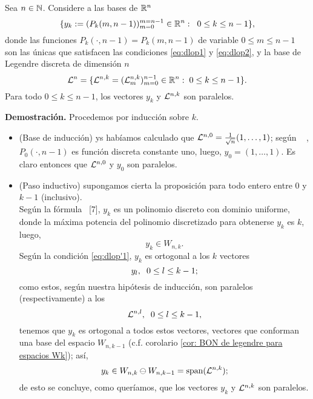 \begin{lema}
\label{prop: legendre y DLOPS son paralelos}
Sea $n \in \mathbb{N}$. 
Considere a 
las bases de $\mathbb{R}^{n}$
\begin{equation}
\label{eq0: base DLOP}
\{
y_{k}:= (P_{k}(m, n-1))_{m=0}^{m=n-1} \in \mathbb{R}^{n}
: \hspace{0.2cm} 0 \leq k \leq n-1
\},
\end{equation}
donde las funciones $P_{k}(\cdot , n-1)= P_{k}(m , n-1)$ de variable 
$0 \leq m \leq n-1$
son las únicas que satisfacen las condiciones
\eqref{eq:dlop1} y \eqref{eq:dlop2},
y la base de Legendre discreta de dimensión $n$
\begin{equation}
\label{eq0: base de Legendre discreta}
\mathcal{L}^{n}=\{ \mathcal{L}^{n,k}= (\mathcal{L}_{m}^{n,k})_{m=0}^{n-1} \in \mathbb{R}^{n} : 
\hspace{0.1cm} 0 \leq k \leq n-1\}.
\end{equation}
Para todo $0 \leq k \leq n-1$, los vectores 
$y_{k}$ y $\mathcal{L}^{n,k}$ son paralelos.
\end{lema}
\noindent
\textbf{Demostración.}
Procedemos por inducción sobre $k$.
\begin{itemize}
	\item  (Base de inducción) ys habíamos calculado que
	$\mathcal{L}^{n,0}=\frac{1}{\sqrt{n}}(1, \ldots , 1)$; 
	según ~\cite{Neuman}
	,
	 $P_{0}(\cdot , n-1)$ es función discreta constante uno, 
	luego, $y_{0}=(1, \ldots , 1)$. 
	Es	
	claro entonces que $\mathcal{L}^{n,0}$ 
	y $y_{0}$	
	son paralelos.
	
	\item (Paso inductivo) supongamos cierta la proposición para
	todo entero entre 0 y $k-1$ (inclusivo).	\\
	Según la fórmula
	~\cite{Neuman}[7], $y_{k}$ es
	un polinomio discreto con dominio 
	uniforme, donde la máxima potencia
	del polinomio discretizado para obtenerse 
	$y_{k}$ es $k$, luego,
	\[
	y_{k} \in W_{n,k}.
	\]	
	Según la condición \eqref{eq:dlop'1}, $y_{k}$ es ortogonal a
	los $k$ vectores
	\[
	y_{l}, \hspace{0.2cm} 0 \leq l \leq k-1;
	\] 
	como estos, según
	nuestra hipótesis de inducción, son paralelos (respectivamente)
	a los
	\[
	\mathcal{L}^{n, l}, \hspace{0.2cm} 0 \leq l \leq k-1,
	\] 
	tenemos que $y_{k}$ es ortogonal a todos estos vectores,
	vectores que conforman una base del espacio $W_{n,k-1}$
	(c.f. corolario \ref{cor: BON de legendre para espacios Wk}); así,
	\[
	y_{k} \in W_{n,k} 
	\ominus W_{n,k-1}=\text{span}(\mathcal{L}^{n,k});
	\]
	de esto se concluye, como queríamos, que los vectores 
	$y_{k}$ y $\mathcal{L}^{n,k}$
	son paralelos. \QEDB 
\end{itemize}
\vspace{0.2cm}




